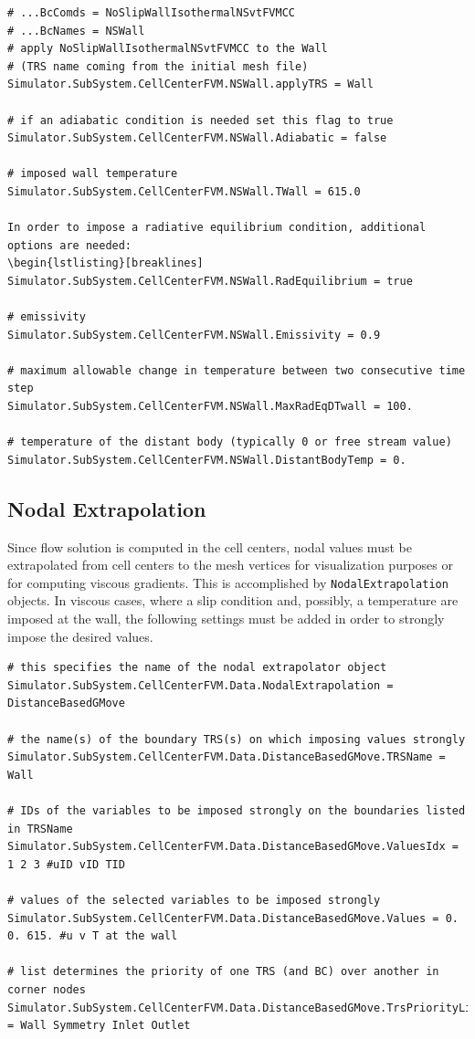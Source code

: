 \documentclass[11pt]{article}
\begin{document}
\begin{lstlisting}[breaklines]
# ...BcComds = NoSlipWallIsothermalNSvtFVMCC
# ...BcNames = NSWall
# apply NoSlipWallIsothermalNSvtFVMCC to the Wall
# (TRS name coming from the initial mesh file)
Simulator.SubSystem.CellCenterFVM.NSWall.applyTRS = Wall

# if an adiabatic condition is needed set this flag to true
Simulator.SubSystem.CellCenterFVM.NSWall.Adiabatic = false

# imposed wall temperature
Simulator.SubSystem.CellCenterFVM.NSWall.TWall = 615.0

In order to impose a radiative equilibrium condition, additional options are needed:
\begin{lstlisting}[breaklines]
Simulator.SubSystem.CellCenterFVM.NSWall.RadEquilibrium = true

# emissivity
Simulator.SubSystem.CellCenterFVM.NSWall.Emissivity = 0.9

# maximum allowable change in temperature between two consecutive time step
Simulator.SubSystem.CellCenterFVM.NSWall.MaxRadEqDTwall = 100.

# temperature of the distant body (typically 0 or free stream value)
Simulator.SubSystem.CellCenterFVM.NSWall.DistantBodyTemp = 0.
\end{lstlisting}

\subsection{Nodal Extrapolation}

Since flow solution is computed in the cell centers, nodal values must be extrapolated from cell centers 
to the mesh vertices for visualization purposes or for computing viscous gradients. This is accomplished by 
{\tt NodalExtrapolation} objects. In viscous cases, where a slip condition and, possibly, a temperature 
are imposed at the wall, the following settings must be added in order to strongly impose the desired values.

\begin{lstlisting}[breaklines]
# this specifies the name of the nodal extrapolator object
Simulator.SubSystem.CellCenterFVM.Data.NodalExtrapolation = DistanceBasedGMove

# the name(s) of the boundary TRS(s) on which imposing values strongly 
Simulator.SubSystem.CellCenterFVM.Data.DistanceBasedGMove.TRSName = Wall

# IDs of the variables to be imposed strongly on the boundaries listed in TRSName
Simulator.SubSystem.CellCenterFVM.Data.DistanceBasedGMove.ValuesIdx = 1 2 3 #uID vID TID

# values of the selected variables to be imposed strongly
Simulator.SubSystem.CellCenterFVM.Data.DistanceBasedGMove.Values = 0. 0. 615. #u v T at the wall

# list determines the priority of one TRS (and BC) over another in corner nodes
Simulator.SubSystem.CellCenterFVM.Data.DistanceBasedGMove.TrsPriorityList = Wall Symmetry Inlet Outlet
\end{lstlisting}
\end{document}
